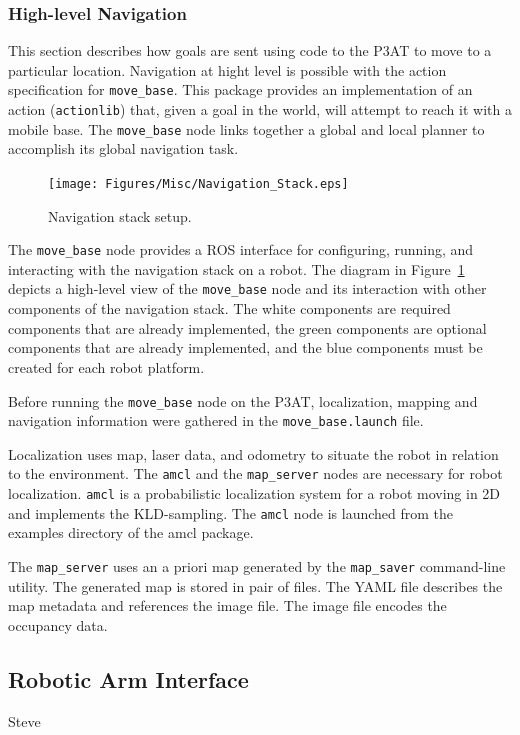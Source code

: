 \subsubsection*{High-level Navigation}
This section describes how goals are sent using code to the P3AT to move to a particular location. Navigation at hight level is possible with the action specification for \texttt{move\_base}. This package provides an implementation of an action (\texttt{actionlib}) that, given a goal in the world, will attempt to reach it with a mobile base. The \texttt{move\_base} node links together a global and local planner to accomplish its global navigation task. 

\begin{figure}[h!]
\centering
\texttt{[image: Figures/Misc/Navigation\_Stack.eps]}
\caption{Navigation stack setup.}\label{fig:navigation_stack}
\end{figure}
The \texttt{move\_base} node provides a ROS interface for configuring, running, and interacting with the navigation stack on a robot. The diagram in Figure~\ref{fig:navigation_stack} depicts a high-level view of the \texttt{move\_base} node and its interaction with other components of the navigation stack. The white components are required components that are already implemented, the green components are optional components that are already implemented, and the blue components must be created for each robot platform. 

 Before running the \texttt{move\_base} node on the P3AT, localization, mapping and navigation information were gathered in the \texttt{move\_base.launch} file.

Localization uses map, laser data, and odometry to situate the robot in relation to the environment. The \texttt{amcl} and the \texttt{map\_server} nodes are necessary for robot localization. \texttt{amcl} is a probabilistic localization system for a robot moving in 2D and implements the KLD-sampling\cite{DIETER.IJRS.2003}. The \texttt{amcl} node is launched from the
examples directory of the amcl package.

The \texttt{map\_server} uses an a priori map generated by the \texttt{map\_saver} command-line utility. The generated map is stored in pair of files. The YAML file describes the map metadata and references the image file. The image file encodes the occupancy data. 



\subsection*{Robotic Arm Interface}
Steve
